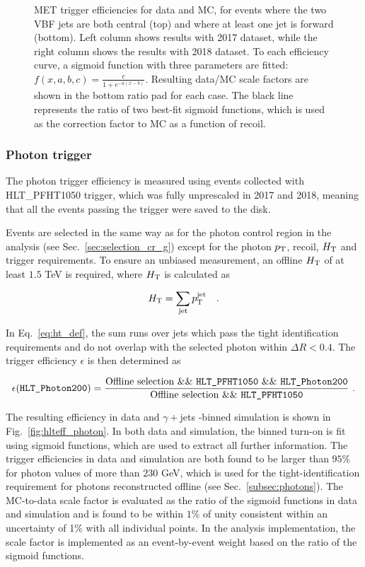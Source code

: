 \begin{figure}[ht!]
    \caption{MET trigger efficiencies for data and MC, for events where the two VBF jets are both central (top) 
    and where at least one jet is forward (bottom). Left column shows results with 2017 dataset, while the right column shows
    the results with 2018 dataset. To each efficiency curve, a sigmoid function 
    with three parameters are fitted: $f(x,a,b,c) = \frac{c}{1+e^{-a(x-b)}}$. 
    Resulting data/MC scale factors are shown in the bottom ratio pad for each case. The black line represents
    the ratio of two best-fit sigmoid functions, which is used as the correction factor to MC as a function of recoil.}
    \label{fig:sigmoid_fits_eff}
\end{figure}

\clearpage

\subsubsection{Photon trigger}
\label{subsubsec:photon_trig}

The photon trigger efficiency is measured using events collected with HLT\_PFHT1050
trigger, which was fully unprescaled in 2017 and 2018, meaning that all the events passing the trigger were saved to the
disk.

Events are selected in the same way as for the photon control region in the analysis
(see Sec.~\ref{sec:selection_cr_g}) except for the photon $p_{\textrm{T}}$, recoil, $H_\mathrm{T}$ and trigger requirements. To ensure an unbiased measurement, 
an offline $H_\mathrm{T}$ of at least $1.5$ TeV is required, where $H_\mathrm{T}$ is calculated as

\begin{equation}
  H_\mathrm{T} = \sum_{\textrm{jet}} p_{\textrm{T}}^{\textrm{jet}} \quad .
  \label{eq:ht_def}
\end{equation}

In Eq.~\ref{eq:ht_def}, the sum runs over jets which pass the tight identification requirements 
and do not overlap with the selected photon within $\Delta R<0.4$. 
The trigger efficiency $\epsilon$ is then determined as

$$\epsilon(\texttt{HLT\_Photon200}) = \frac{\text{Offline selection \&\& \texttt{HLT\_PFHT1050} \&\& 
\texttt{HLT\_Photon200}}}{\text{Offline selection \&\& \texttt{HLT\_PFHT1050}}} \ . $$

The resulting efficiency in data and $\gamma +$jets \HT-binned simulation is shown in Fig.~\ref{fig:hlteff_photon}. In both data and simulation, 
the binned turn-on is fit using sigmoid functions, which are used to extract all further information. The trigger efficiencies in data and simulation are both 
found to be larger than $95\%$ for photon \pt values of more than $230$ GeV, which is used for the tight-identification requirement for photons reconstructed offline
(see Sec.~\ref{subsec:photons}). The MC-to-data scale factor is 
evaluated as the ratio of the sigmoid functions in data and simulation and is found to be within $1\%$ of unity consistent within an uncertainty of 1\% 
with all individual points. In the analysis implementation, the scale factor is implemented as an event-by-event weight based on the ratio of the sigmoid functions.

